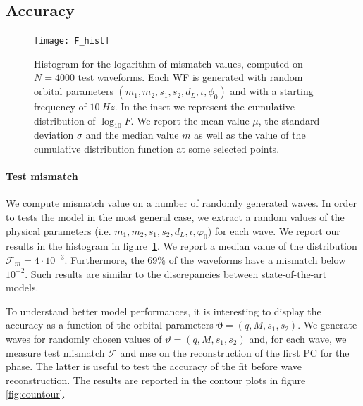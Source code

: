 \subsection{Accuracy}
\begin{figure}
	\centering
    \texttt{[image: F\_hist]}
	\caption{Histogram for the logarithm of mismatch values, computed on $N=4000$ test waveforms. Each WF is generated with random orbital parameters $(m_1,m_2, s_1, s_2, d_L, \iota, \phi_0)$ and with a starting frequency of $\SI{10}{Hz}$.
In the inset we represent the cumulative distribution of $\log_{10} F$.
We report the mean value $\mu$, the standard deviation $\sigma$ and the median value $m$ as well as the value of the cumulative distribution function at some selected points.
}
	\label{fig:F_hist}
\end{figure}
\paragraph{Test mismatch}
We compute mismatch value on a number of randomly generated waves. In order to tests the model in the most general case, we extract a random values of the physical parameters (i.e. $m_1,m_2, s_1, s_2, d_L, \iota, \varphi_0$) for each wave.
We report our results in the histogram in figure~\ref{fig:F_hist}.
We report a median value of the distribution $\mathcal{F}_m = 4 \cdot 10^{-3}$. Furthermore, the $69\%$ of the waveforms have a mismatch below $10^{-2}$. Such results are similar to the discrepancies between state-of-the-art models.
\par
To understand better model performances, it is interesting to display the accuracy as a function of the orbital parameters $\boldsymbol{\vartheta} = (q,M,s_1,s_2)$.
We generate waves for randomly chosen values of $\vartheta = (q, M, s_1, s_2)$ and, for each wave, we measure test mismatch $\mathcal{F}$ and mse on the reconstruction of the first PC for the phase.
The latter is useful to test the accuracy of the fit before wave reconstruction.
The results are reported in the contour plots in figure \ref{fig:countour}.
\par

